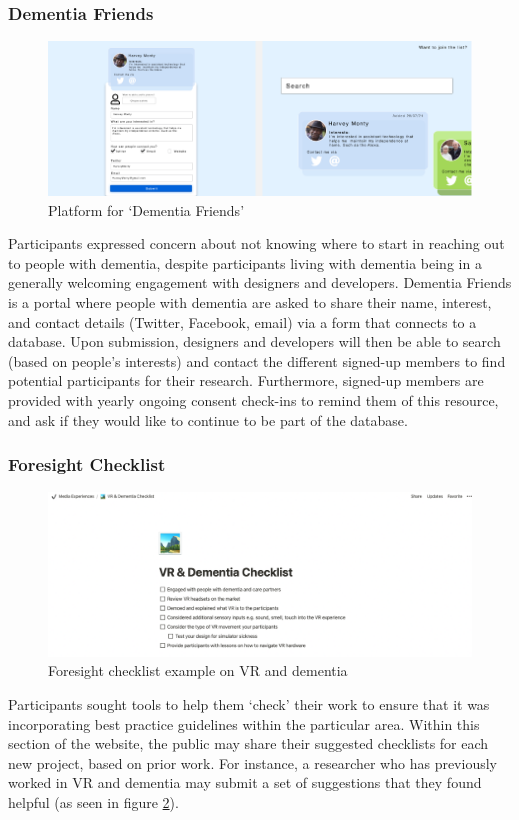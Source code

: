 \subsubsection{Dementia Friends}
\begin{figure}[h]
\centering
\includegraphics[width=1\linewidth]{Images/D3Toolkit/Fig6.png}
\caption{Platform for `Dementia Friends'}
\label{fig:DementiaFriends}
\end{figure}
Participants expressed concern about not knowing where to start in reaching out to people with dementia, despite participants living with dementia being in a generally welcoming engagement with designers and developers. Dementia Friends is a portal where people with dementia are asked to share their name, interest, and contact details (Twitter, Facebook, email) via a form that connects to a database. Upon submission, designers and developers will then be able to search (based on people's interests) and contact the different signed-up members to find potential participants for their research. Furthermore, signed-up members are provided with yearly ongoing consent check-ins to remind them of this resource, and ask if they would like to continue to be part of the database.

\subsubsection{Foresight Checklist}
\begin{figure}[h]
\centering
\includegraphics[width=1\linewidth]{Images/D3Toolkit/Fig7.png}
\caption{Foresight checklist example on VR and dementia}
\label{fig:ForesightChecklist}
\end{figure}
Participants sought tools to help them `check' their work to ensure that it was incorporating best practice guidelines within the particular area. Within this section of the website, the public may share their suggested checklists for each new project, based on prior work. For instance, a researcher who has previously worked in VR and dementia may submit a set of suggestions that they found helpful (as seen in figure \ref{fig:ForesightChecklist}).

